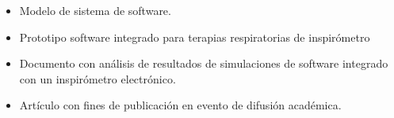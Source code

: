 \begin{itemize}

\item Modelo de sistema de software.

\item Prototipo software integrado para terapias respiratorias de inspir\'ometro

\item Documento con an\'alisis de resultados de simulaciones de software integrado con un inspir\'ometro electr\'onico.

\item Art\'iculo con fines de publicaci\'on en evento de difusi\'on acad\'emica.

\end{itemize}


